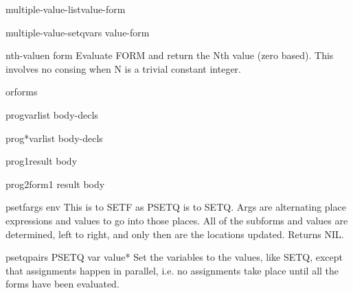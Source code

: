 \begin{macro}{multiple-value-list}{value-form}{}{}
  
\end{macro}

\begin{macro}{multiple-value-setq}{vars value-form}{}{}
  
\end{macro}

\begin{macro}{nth-value}{n form}{}{}
  Evaluate FORM and return the Nth value (zero based). This involves no
  consing when N is a trivial constant integer.
\end{macro}

\begin{macro}{or}{\rest forms}{}{}
  
\end{macro}

\begin{macro}{prog}{varlist \body body-decls}{}{}
  
\end{macro}

\begin{macro}{prog*}{varlist \body body-decls}{}{}
  
\end{macro}

\begin{macro}{prog1}{result \body body}{}{}
  
\end{macro}

\begin{macro}{prog2}{form1 result \body body}{}{}
  
\end{macro}

\begin{macro}{psetf}{\rest args \env env}{}{}
  This is to SETF as PSETQ is to SETQ. Args are alternating place
  expressions and values to go into those places. All of the subforms and
  values are determined, left to right, and only then are the locations
  updated. Returns NIL.
\end{macro}

\begin{macro}{psetq}{\rest pairs}{}{}
  PSETQ {var value}*
   Set the variables to the values, like SETQ, except that assignments
   happen in parallel, i.e. no assignments take place until all the
   forms have been evaluated.
\end{macro}

